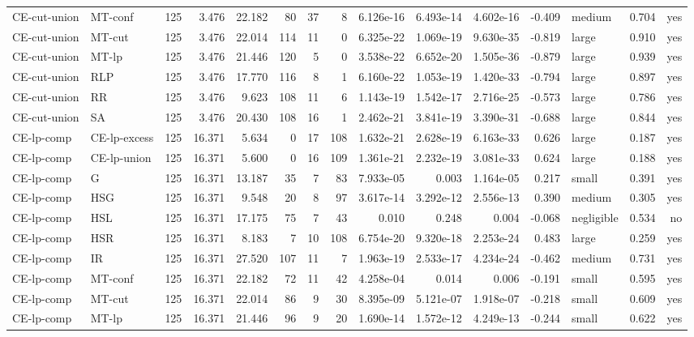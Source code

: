 \begin{table}[htbp]
\begin{tabular}{llrrrrrrrrrrlrr}
CE-cut-union & MT-conf & 125 & 3.476 & 22.182 & 80 & 37 & 8 & 6.126e-16 & 6.493e-14 & 4.602e-16 & -0.409 & medium & 0.704 & yes \\
CE-cut-union & MT-cut & 125 & 3.476 & 22.014 & 114 & 11 & 0 & 6.325e-22 & 1.069e-19 & 9.630e-35 & -0.819 & large & 0.910 & yes \\
CE-cut-union & MT-lp & 125 & 3.476 & 21.446 & 120 & 5 & 0 & 3.538e-22 & 6.652e-20 & 1.505e-36 & -0.879 & large & 0.939 & yes \\
CE-cut-union & RLP & 125 & 3.476 & 17.770 & 116 & 8 & 1 & 6.160e-22 & 1.053e-19 & 1.420e-33 & -0.794 & large & 0.897 & yes \\
CE-cut-union & RR & 125 & 3.476 & 9.623 & 108 & 11 & 6 & 1.143e-19 & 1.542e-17 & 2.716e-25 & -0.573 & large & 0.786 & yes \\
CE-cut-union & SA & 125 & 3.476 & 20.430 & 108 & 16 & 1 & 2.462e-21 & 3.841e-19 & 3.390e-31 & -0.688 & large & 0.844 & yes \\
CE-lp-comp & CE-lp-excess & 125 & 16.371 & 5.634 & 0 & 17 & 108 & 1.632e-21 & 2.628e-19 & 6.163e-33 & 0.626 & large & 0.187 & yes \\
CE-lp-comp & CE-lp-union & 125 & 16.371 & 5.600 & 0 & 16 & 109 & 1.361e-21 & 2.232e-19 & 3.081e-33 & 0.624 & large & 0.188 & yes \\
CE-lp-comp & G & 125 & 16.371 & 13.187 & 35 & 7 & 83 & 7.933e-05 & 0.003 & 1.164e-05 & 0.217 & small & 0.391 & yes \\
CE-lp-comp & HSG & 125 & 16.371 & 9.548 & 20 & 8 & 97 & 3.617e-14 & 3.292e-12 & 2.556e-13 & 0.390 & medium & 0.305 & yes \\
CE-lp-comp & HSL & 125 & 16.371 & 17.175 & 75 & 7 & 43 & 0.010 & 0.248 & 0.004 & -0.068 & negligible & 0.534 & no \\
CE-lp-comp & HSR & 125 & 16.371 & 8.183 & 7 & 10 & 108 & 6.754e-20 & 9.320e-18 & 2.253e-24 & 0.483 & large & 0.259 & yes \\
CE-lp-comp & IR & 125 & 16.371 & 27.520 & 107 & 11 & 7 & 1.963e-19 & 2.533e-17 & 4.234e-24 & -0.462 & medium & 0.731 & yes \\
CE-lp-comp & MT-conf & 125 & 16.371 & 22.182 & 72 & 11 & 42 & 4.258e-04 & 0.014 & 0.006 & -0.191 & small & 0.595 & yes \\
CE-lp-comp & MT-cut & 125 & 16.371 & 22.014 & 86 & 9 & 30 & 8.395e-09 & 5.121e-07 & 1.918e-07 & -0.218 & small & 0.609 & yes \\
CE-lp-comp & MT-lp & 125 & 16.371 & 21.446 & 96 & 9 & 20 & 1.690e-14 & 1.572e-12 & 4.249e-13 & -0.244 & small & 0.622 & yes \\

\end{tabular}
\end{table}
